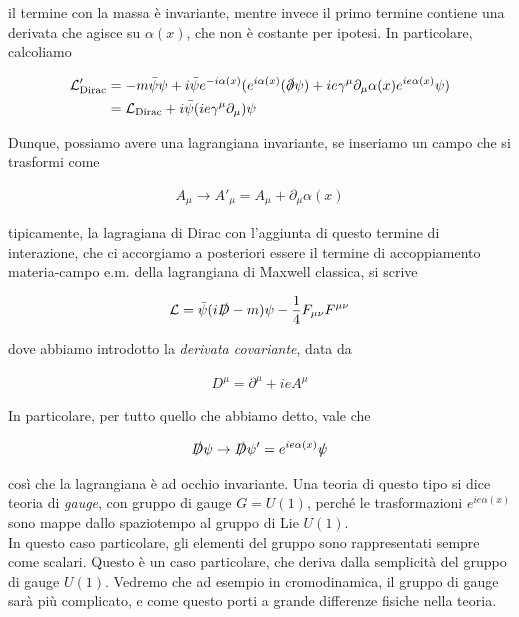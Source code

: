 \documentclass[11pt]{report}
\begin{document}
il termine con la massa è invariante, mentre invece il primo termine contiene una derivata che agisce su \(\alpha(x)\), che non è costante per ipotesi. In particolare, calcoliamo

\begin{align}
    \mathcal{L}'_{\text{Dirac}} &= -m\bar{\psi}\psi + i\bar{\psi}e^{-i\alpha(x)}(e^{i\alpha(x)}(\slashed{\partial}\psi) + ie \gamma^\mu \partial_\mu \alpha(x)e^{ie\alpha(x)}\psi) \\
    &= \mathcal{L}_{\text{Dirac}} + i\bar{\psi}(ie\gamma^\mu\partial_\mu)\psi
\end{align}

Dunque, possiamo avere una lagrangiana invariante, se inseriamo un campo che si trasformi come 

\begin{align}
    A_\mu \rightarrow A'_\mu = A_\mu + \partial_\mu\alpha(x)
\end{align}

tipicamente, la lagragiana di Dirac con l'aggiunta di questo termine di interazione, che ci accorgiamo a posteriori essere il termine di accoppiamento materia-campo e.m. della lagrangiana di Maxwell classica, si scrive 

\begin{align}
    \mathcal{L} = \bar{\psi}(i\slashed{D} - m)\psi -\frac{1}{4}F_{\mu\nu}F^{\mu\nu}
\end{align}

dove abbiamo introdotto la \emph{derivata covariante}, data da 

\begin{align}
    D^\mu = \partial^\mu + ieA^\mu
\end{align}

In particolare, per tutto quello che abbiamo detto, vale che 

\begin{align}
    \slashed{D}\psi \rightarrow \slashed{D}\psi' = e^{ie\alpha(x)}\slashed{\psi}
\end{align}

così che la lagrangiana è ad occhio invariante. Una teoria di questo tipo si dice teoria di \emph{gauge}, con gruppo di gauge \(G = U(1)\), perché le trasformazioni \(e^{ie\alpha(x)}\) sono mappe dallo spaziotempo al gruppo di Lie \(U(1)\). \\

In questo caso particolare, gli elementi del gruppo sono rappresentati sempre come scalari. Questo è un caso particolare, che deriva dalla semplicità del gruppo di gauge \(U(1)\). Vedremo che ad esempio in cromodinamica, il gruppo di gauge sarà più complicato, e come questo porti a grande differenze fisiche nella teoria.   
\end{document}

